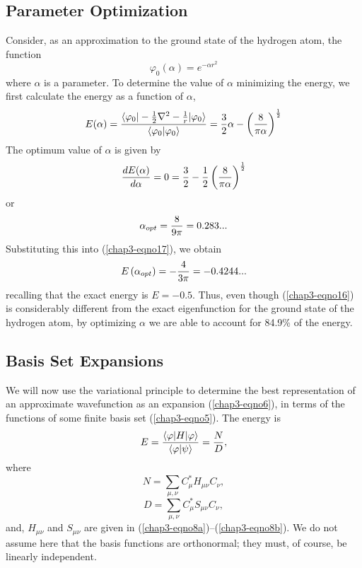 \subsection{Parameter Optimization}

Consider, as an approximation to the ground state of the hydrogen atom, the
function
\begin{equation}
\varphi_0 ( \alpha ) = e^{- \alpha r^2}
\label{chap3-eqno16}
\end{equation}
where $\alpha$ is a parameter. To determine the value of $\alpha$
minimizing the energy, we first calculate the energy as a function of
$\alpha$,
\begin{equation}
E ( \alpha ) = {\langle \varphi_0 \vert - {1 \over 2} \nabla^2 - {1 
\over r} \vert \varphi_0 \rangle \over \langle \varphi_0 \vert \varphi_0 
\rangle} = {3 \over 2}\alpha - \left( {8 \over \pi \alpha} 
\right)^{{1 \over 2}}
\label{chap3-eqno17}
\end{equation}
The optimum value of $\alpha$ is given by
\begin{equation}
{dE ( \alpha ) \over d \alpha} = 0 = {3 \over 2} - {1 \over 2} \left( 
{8 \over \pi \alpha} \right)^{{1 \over 2}}
\end{equation}
or
\begin{equation}
\alpha_{opt} = {8 \over 9 \pi} = 0.283 ...
\end{equation}
Substituting this into (\ref{chap3-eqno17}), we obtain
\begin{equation}
E \left( \alpha_{opt} \right) = - {4 \over 3 \pi} = - 0.4244 ...
\end{equation}
recalling that the exact energy is $E = -0.5$. Thus, even though
(\ref{chap3-eqno16}) is considerably different from the exact
eigenfunction for the ground state of the hydrogen atom, by optimizing
$\alpha$ we are able to account for 84.9\% of the energy.

\subsection{Basis Set Expansions}

We will now use the variational principle to determine the best
representation of an approximate wavefunction as an expansion
(\ref{chap3-eqno6}), in terms of the functions of some finite basis
set (\ref{chap3-eqno5}). The energy is
\begin{equation}
E = {\langle \varphi \vert H \vert \varphi \rangle \over \langle 
\varphi \vert \psi \rangle} = {N \over D} ,
\label{chap3-eqno18}
\end{equation}
where
\begin{equation}
N = \sum_{\mu , \nu} C^*_{\mu} H_{\mu \nu} C_{\nu} ,
\end{equation}
\begin{equation}
D = \sum _{\mu , \nu} C^*_{\mu} S_{\mu \nu} C_{\nu},
\end{equation}
and, $H_{\mu \nu}$ and $S_{\mu \nu}$ are given in
(\ref{chap3-eqno8a})--(\ref{chap3-eqno8b}).  We do not assume here
that the basis functions are orthonormal; they must, of course, be
linearly independent.

